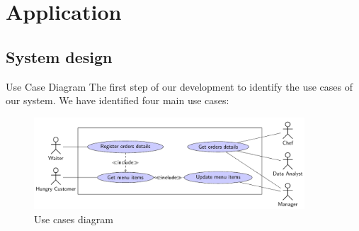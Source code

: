

\section{Application}

\subsection{System design}

\begin{frame}{Use Case Diagram}
	The first step of our development to identify the use cases of our system.
	We have identified four main use cases:

	\begin{figure}[h!]
		\centering
		\includegraphics[width=0.9\textwidth,height=0.55\textheight,keepaspectratio]{images/usecases}
		\vspace*{-1\baselineskip}
		\caption{Use cases diagram}
		\label{fig:usecases}
	\end{figure}

\end{frame}

